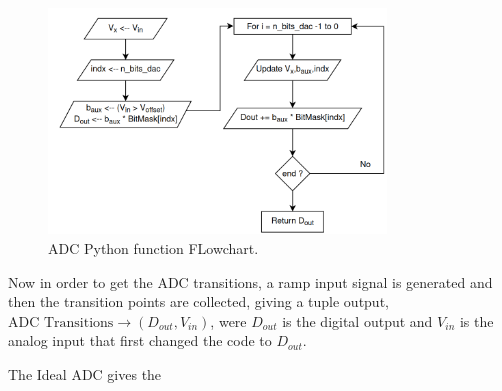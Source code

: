 \begin{figure}[H]

    \centering
    \includegraphics*[width=0.8\textwidth]{Images/ADCPythonFlowChart.png}
    \caption{ADC Python function FLowchart.}

    \label{fig:ADCFlowChart}
\end{figure}

Now in order to get the ADC transitions, a ramp input signal is generated and then the transition points are collected, giving a tuple output, $\text{ADC Transitions} \longrightarrow ( D_{out}, V_{in} ) $, were $D_{out}$ is the digital output and $V_{in}$ is the analog input that first changed the code to $D_{out}$. 

The Ideal ADC gives the 

